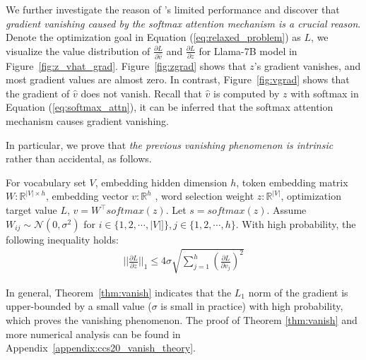 We further investigate the reason of \cite{song2020information}'s  limited performance and discover that \emph{gradient vanishing caused by the softmax attention mechanism is a crucial reason}. Denote the optimization goal in Equation (\ref{eq:relaxed_problem}) as $L$, we visualize the value distribution of $\frac{\partial L}{\partial \hat{v}}$ and $\frac{\partial L}{\partial z}$ for Llama-7B model in Figure~\ref{fig:z_vhat_grad}.  Figure~\ref{fig:zgrad} shows that $z$'s gradient vanishes, and most gradient values are almost zero. In contrast, Figure~\ref{fig:vgrad} shows that the gradient of $\hat{v}$ does not vanish. Recall that $\hat{v}$ is computed by $z$ with  softmax in Equation (\ref{eq:softmax_attn}), it can be inferred that the softmax attention mechanism causes gradient vanishing. %

In particular, we prove that \emph{the previous vanishing phenomenon is intrinsic} rather than accidental, as follows.


\begin{theorem}
\label{thm:vanish}
For vocabulary set $V$, embedding hidden dimension $h$, token embedding matrix $W:\mathbb{R}^{|V|\times h}$, embedding vector $v:  \mathbb{R}^{h}$ , word selection weight $z:\mathbb{R}^{|V|}$, optimization target value $L$, $v=W^\top softmax(z)$. Let $s=softmax(z)$. Assume $W_{ij} \sim \mathcal {N}(0,\sigma^2)$ for $i\in \{1,2,\cdots,|V|]\}, j \in \{1,2,\cdots,h\}$. With high probability, the following inequality holds:\\
\begin{align}
    ||\frac{\partial L}{\partial z} ||_1\le 4  \sigma \sqrt{\sum_{j=1}^h (\frac{\partial L}{\partial v_j})^2}
\end{align}

\end{theorem}


In general, Theorem~\ref{thm:vanish} indicates that the $L_1$ norm of the gradient is upper-bounded by a small value ($\sigma$ is small in practice) with high probability, which proves the vanishing phenomenon. %
The proof of Theorem \ref{thm:vanish} and more numerical analysis can be found in Appendix~\ref{appendix:ccs20_vanish_theory}.

